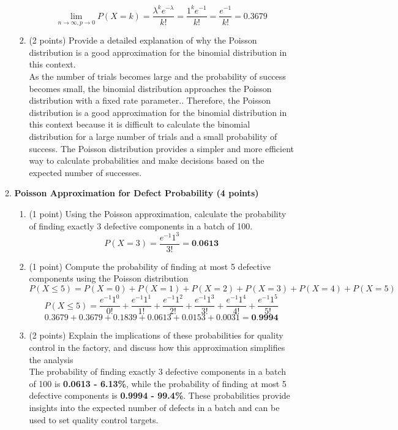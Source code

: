 \documentclass[a3paper,12pt]{article} %
\begin{document}
\begin{enumerate}
\begin{enumerate}
\begin{enumerate}
\[            \]
            \[
                \lim_{n \to \infty, p \to 0} P(X = k) = \frac{\lambda^k e^{-\lambda}}{k!} = \frac{1^k e^{-1}}{k!} = \frac{e^{-1}}{k!} = 0.3679
            \]
            \item (2 points) Provide a detailed explanation of why the Poisson distribution is a good approximation for the binomial distribution in this context.
            \\ As the number of trials becomes large and the probability of success becomes small, the binomial distribution approaches the Poisson distribution with a fixed rate parameter.. Therefore, the Poisson distribution is a good approximation for the binomial distribution in this context because it is difficult to calculate the binomial distribution for a large number of trials and a small probability of success. The Poisson distribution provides a simpler and more efficient way to calculate probabilities and make decisions based on the expected number of successes.
        \end{enumerate}  
        \item \textbf{Poisson Approximation for Defect Probability (4 points)}
        \begin{enumerate}
            \item (1 point) Using the Poisson approximation, calculate the probability of finding exactly 3 defective components in a batch of 100.
            \[
                P(X = 3) = \frac{e^{-1} 1^3}{3!} = \textbf{0.0613}
            \]
            \item (1 point) Compute the probability of finding at most 5 defective components using the Poisson distribution
            \[
                P(X \leq 5) = P(X = 0) + P(X = 1) + P(X = 2) + P(X = 3) + P(X = 4) + P(X = 5) 
            \]
            \[
                P(X \leq 5) = \frac{e^{-1} 1^0}{0!} + \frac{e^{-1} 1^1}{1!} + \frac{e^{-1} 1^2}{2!} + \frac{e^{-1} 1^3}{3!} + \frac{e^{-1} 1^4}{4!} + \frac{e^{-1} 1^5}{5!}
            \]
            \[
                0.3679 + 0.3679 + 0.1839 + 0.0613 + 0.0153 + 0.0031 = \textbf{0.9994}
            \]
            \item (2 points) Explain the implications of these probabilities for quality control in the factory, and discuss how this approximation simplifies the analysis
            \\ The probability of finding exactly 3 defective components in a batch of 100 is \textbf{0.0613 - 6.13\%}, while the probability of finding at most 5 defective components is \textbf{0.9994 - 99.4\%}. These probabilities provide insights into the expected number of defects in a batch and can be used to set quality control targets. 

\end{enumerate}
\end{enumerate}
\end{enumerate}
\end{document}
